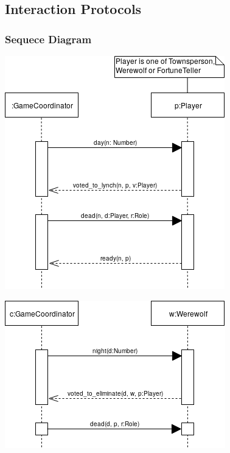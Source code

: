 \documentclass{article}
\begin{document}
\subsection{Interaction Protocols}
\subsubsection{Sequece Diagram}

\begin{center}
\includegraphics[scale=0.6]{./images/sequence_diagram_day_vote.png}
\end{center}

\begin{center}
\includegraphics[scale=0.6]{./images/sequence_diagram_night_vote.png}
\end{center}
\end{document}
